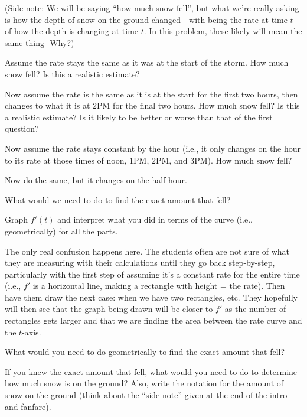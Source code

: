 \documentclass{ximera}
\begin{document}
(Side note:  We will be saying ``how much snow fell'', but what we're really asking is how the depth of snow on the ground changed - with  being the rate at time $t$ of how the depth is changing at time $t$.  In this problem, these likely will mean the same thing- Why?)

\begin{question} 
Assume the rate stays the same as it was at the start of the storm.  How much snow fell?  Is this a realistic estimate?
\end{question}

\begin{question} 
Now assume the rate is the same as it is at the start for the first two hours, then changes to what it is at $2$PM for the final two hours.  How much snow fell?  Is this a realistic estimate?  Is it likely to be better or worse than that of the first question?
\end{question} 
\begin{question} 
Now assume the rate stays constant by the hour (i.e., it only changes on the hour to its rate at those times of noon, $1$PM, $2$PM, and $3$PM).  How much snow fell?
\end{question} 

\begin{question} 
Now do the same, but it changes on the half-hour.
\end{question} 
\begin{question} 
What would we need to do to find the exact amount that fell?
\end{question} 

\begin{question} 
Graph $f'(t)$  and interpret what you did in terms of the curve (i.e., geometrically) for all the parts.
\begin{instructorNotes}
The only real confusion happens here.  The students often are not sure of what they are measuring with their calculations until they go back step-by-step, particularly with the first step of assuming it's a constant rate for the entire time (i.e., $f'$ is a horizontal line, making a rectangle with height = the rate).  Then have them draw the next case: when we have two rectangles, etc.  They hopefully will then see that the graph being drawn will be closer to $f'$ as the number of rectangles gets larger and that we are finding the area between the rate curve and the $t$-axis.
\end{instructorNotes}

\end{question} 

\begin{question} 
What would you need to do geometrically to find the exact amount that fell?
\end{question}

\begin{question} 
If you knew the exact amount that fell, what would you need to do to determine how much snow is on the ground?  Also, write the notation for the amount of snow on the ground (think about the ``side note'' given at the end of the intro and fanfare).

\end{question} 
\end{document}
